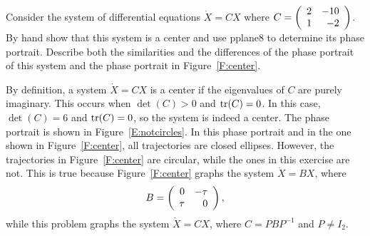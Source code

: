 \documentclass{ximera}
\begin{document}
\CEXER

\begin{exercise}  \label{E:notcircles}
Consider the system of differential equations $\dot{X}=CX$ where
$C=\left(\begin{array}{rr} 2 & -10\\ 1 &-2\end{array}\right)$.  By hand show that this system is a center and
use {\sf pplane8} to determine its phase portrait.  Describe both the
similarities and the differences of the phase portrait of this system
and the phase portrait in Figure~\ref{F:center}.

\begin{solution}

By definition, a system $\dot{X} = CX$ is a center if the eigenvalues
of $C$ are purely imaginary.  This occurs when $\det(C) > 0$ and
${\rm tr}(C) = 0$.  In this case, $\det(C) = 6$ and ${\rm tr}(C) = 0$, so
the system is indeed a center.  The phase portrait is shown in
Figure~\ref{E:notcircles}.  In this phase portrait and in the one
shown in Figure~\ref{F:center}, all
trajectories are closed ellipses.  However, the trajectories in
Figure~\ref{F:center} are circular, while the ones in this exercise
are not.  This is true because Figure~\ref{F:center} graphs the system
$\dot{X} = BX$, where
\[ B = \left(\begin{array}{rr} 0 & -\tau\\ \tau &0\end{array}\right), \]
while this problem graphs the system $\dot{X} = CX$, where $C = 
PBP^{-1}$ and $P \neq I_2$.

\begin{figure}[htb]
                       \centerline{%
                       }
\end{figure}

\end{solution}
\end{exercise}
\end{document}
